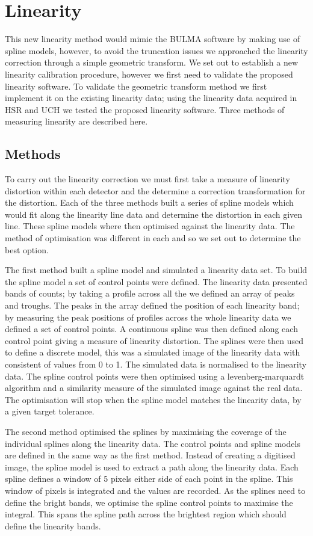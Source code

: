 \section{Linearity}
This new linearity method would mimic the BULMA software by making use of spline models, however, to avoid the truncation issues we approached the linearity correction through a simple geometric transform. We set out to establish a new linearity calibration procedure, however we first need to validate the proposed linearity software. To validate the geometric transform method we first implement it on the existing linearity data; using the linearity data acquired in \acrshort{HSR} and \acrshort{UCH} we tested the proposed linearity software. Three methods of measuring linearity are described here. 
\subsection{Methods}
To carry out the linearity correction we must first take a measure of linearity distortion within each detector and the determine a correction transformation for the distortion. Each of the three methods built a series of spline models which would fit along the linearity line data and determine the distortion in each given line. These spline models where then optimised against the linearity data. The method of optimisation was different in each and so we set out to determine the best option. 

The first method built a spline model and simulated a linearity data set. To build the spline model a set of control points were defined. The linearity data presented bands of counts; by taking a profile across all the we defined an array of peaks and troughs. The peaks in the array defined the position of each linearity band; by measuring the peak positions of profiles across the whole linearity data we defined a set of control points. A continuous spline was then defined along each control point giving a measure of linearity distortion. The splines were then used to define a discrete model, this was a simulated image of the linearity data with consistent of values from 0 to 1. The simulated data is normalised to the linearity data. The spline control points were then optimised using a levenberg-marquardt algorithm and a similarity measure of the simulated image against the real data. The optimisation will stop when the spline model matches the linearity data, by a given target tolerance. 

The second method optimised the splines by maximising the coverage of the individual splines along the linearity data. The control points and spline models are defined in the same way as the first method. Instead of creating a digitised image, the spline model is used to extract a path along the linearity data. Each spline defines a window of 5 pixels either side of each point in the spline. This window of pixels is integrated and the values are recorded. As the splines need to define the bright bands, we optimise the spline control points to maximise the integral. This spans the spline path across  the brightest region which should define the linearity bands. 

